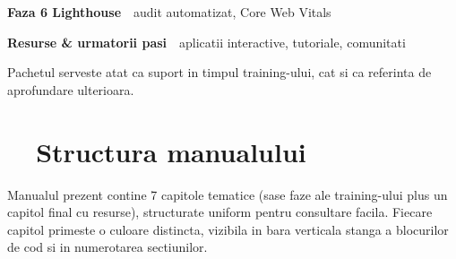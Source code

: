 \documentclass[11pt,a4paper]{article}
\begin{document}
\begin{titlepage}
  \noindent
  \begin{tcolorbox}[
    enhanced, colback=themeLighthouse!8, colframe=themeLighthouse, boxrule=0pt, leftrule=5pt,
    arc=4pt, sharp corners=downhill, rounded corners=northwest, left=10pt, right=10pt, top=6pt, bottom=6pt,
  ]
    \begin{minipage}[c]{0.06\linewidth}\color{themeLighthouse}\Large\faChartBar\end{minipage}\hfill
    \begin{minipage}[c]{0.92\linewidth}\textbf{\color{themeLighthouse}Faza 6 \textbar{} Lighthouse} \,\textendash\, audit automatizat, Core Web Vitals\end{minipage}
  \end{tcolorbox}

  \noindent
  \begin{tcolorbox}[
    enhanced, colback=themeResurse!8, colframe=themeResurse, boxrule=0pt, leftrule=5pt,
    arc=4pt, sharp corners=downhill, rounded corners=northwest, left=10pt, right=10pt, top=6pt, bottom=6pt,
  ]
    \begin{minipage}[c]{0.06\linewidth}\color{themeResurse}\Large\faGraduationCap\end{minipage}\hfill
    \begin{minipage}[c]{0.92\linewidth}\textbf{\color{themeResurse}Resurse \& urmatorii pasi} \,\textendash\, aplicatii interactive, tutoriale, comunitati\end{minipage}
  \end{tcolorbox}

  \vfill
  \begin{center}
    \small\color{black!60}\sffamily
    Pachetul serveste atat ca suport in timpul training-ului, cat si ca referinta de aprofundare ulterioara.
  \end{center}
\end{titlepage}


\section*{\faBookOpen\ \ Structura manualului}

Manualul prezent contine 7 capitole tematice (sase faze ale training-ului plus un capitol final cu resurse), structurate uniform pentru consultare facila. Fiecare capitol primeste o culoare distincta, vizibila in bara verticala stanga a blocurilor de cod si in numerotarea sectiunilor.
\end{document}
